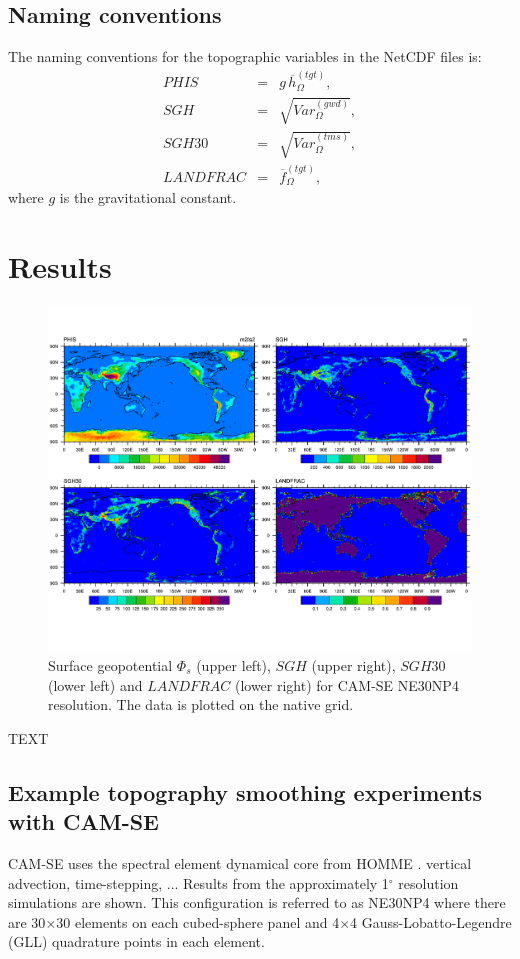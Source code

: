 \documentclass[gmd]{copernicus}
\begin{document}
\subsection{Naming conventions}\label{sec:naming-conventions}
The naming conventions for the topographic variables in the NetCDF files is:
\begin{eqnarray}
PHIS  &=& g\, {\overline{h}}^{(tgt)}_{\Omega},\\
SGH   &=& \sqrt{Var^{(gwd)}_\Omega},\\
SGH30 &=& \sqrt{Var^{(tms)}_\Omega},\\
LANDFRAC &=& \overline{f}^{(tgt)}_\Omega,
\end{eqnarray}
where $g$ is the gravitational constant.
{\color{red}{is SGH computed on $\Phi_s$ or $h$?}}


\section{Results}
\begin{figure}[t]
\vspace*{2mm}
\begin{center}
\includegraphics[width=12cm]{fig/topo-vars_global}
\end{center}
  \caption{Surface geopotential $\Phi_s$ (upper left), $SGH$ (upper right), $SGH30$ (lower left) and $LANDFRAC$ (lower right) for CAM-SE NE30NP4 resolution. The data is plotted on the native grid.}\label{fig:topo-vars}
\end{figure}


TEXT

\subsection{Example topography smoothing experiments with CAM-SE}
CAM-SE uses the spectral element dynamical core from HOMME \citep[High-Order Method Modeling Environment; ][]{HOMME,DetAl2005IJHPCA}. vertical advection, time-stepping, ... Results from the approximately 1$^\circ$ resolution simulations are shown. This configuration is referred to as NE30NP4 where there are 30$\times$30 elements on each cubed-sphere panel and 4$\times$4 Gauss-Lobatto-Legendre (GLL) quadrature points in each element.
\end{document}
